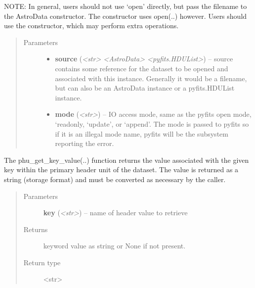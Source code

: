 \documentclass[letterpaper,10pt,english]{sphinxmanual}
\begin{document}
\begin{fulllineitems}
\begin{fulllineitems}
NOTE: In general, users should not use `open' directly, but pass
the filename to the AstroData constructor. The constructor uses
open(..) however. Users should use the constructor, which may 
perform extra operations.
\begin{quote}\begin{description}
\item[{Parameters}] \leavevmode\begin{itemize}
\item {} 
\textbf{source} (\emph{\textless{}str\textgreater{} \textbar{} \textless{}AstroData\textgreater{} \textbar{} \textless{}pyfits.HDUList\textgreater{}}) -- source contains some reference for the dataset to 
be opened and associated with this instance. Generally
it would be a filename, but can also be
an AstroData instance or a pyfits.HDUList instance.

\item {} 
\textbf{mode} (\emph{\textless{}str\textgreater{}}) -- IO access mode, same as the pyfits open mode, `readonly,
`update', or `append'.  The mode is passed to pyfits so
if it is an illegal mode name, pyfits will be the
subsystem reporting the error.

\end{itemize}

\end{description}\end{quote}

\end{fulllineitems}


\begin{fulllineitems}
\label{astro_class:astrodata.AstroData.phu_get_key_value}
The phu\_get\_key\_value(..) function returns the value associated 
with the given key within the primary header unit of the dataset.
The value is returned as a string (storage format) and must be 
converted as necessary by the caller.
\begin{quote}\begin{description}
\item[{Parameters}] \leavevmode
\textbf{key} (\emph{\textless{}str\textgreater{}}) -- name of header value to retrieve

\item[{Returns}] \leavevmode
keyword value as string or None if not present.

\item[{Return type}] \leavevmode
\textless{}str\textgreater{}


\end{description}
\end{quote}
\end{fulllineitems}
\end{fulllineitems}
\end{document}
